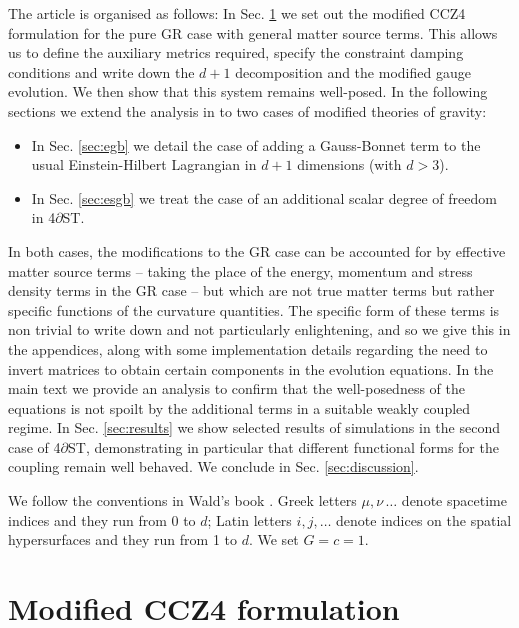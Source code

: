 \documentclass[reprint,aps,amsmath,amssymb,twoside,prd,showkeys,superscriptaddress,nofootinbib]{revtex4-2}
\begin{document}
The article is organised as follows: In Sec. \ref{sec:mCCZ4} we set out the modified CCZ4 formulation for the pure GR case with general matter source terms. This allows us to define the auxiliary metrics required, specify the constraint damping conditions and write down the $d+1$ decomposition and the modified gauge evolution. We then show that this system remains well-posed. In the following sections we extend the analysis in \cite{AresteSalo:2022hua} to two cases of modified theories of gravity:
\begin{itemize}
    \item In Sec. \ref{sec:egb} we detail the case of adding a Gauss-Bonnet term to the usual Einstein-Hilbert Lagrangian in $d+1$ dimensions (with $d>3$).
    \item In Sec. \ref{sec:esgb} we treat the case of an additional scalar degree of freedom in 4$\partial$ST.
\end{itemize}
In both cases, the modifications to the GR case can be accounted for by effective matter source terms -- taking the place of the energy, momentum and stress density terms in the GR case -- but which are not true matter terms but rather specific functions of the curvature quantities. The specific form of these terms is non trivial to write down and not particularly enlightening, and so we give this in the appendices, along with some implementation details regarding the need to invert matrices to obtain certain components in the evolution equations. In the main text we provide an analysis to confirm that the well-posedness of the equations is not spoilt by the additional terms in a suitable weakly coupled regime.
In Sec. \ref{sec:results} we show selected results of simulations in the second case of 4$\partial$ST, demonstrating in particular that different functional forms for the coupling remain well behaved. We conclude in Sec. \ref{sec:discussion}. 

We follow the conventions in Wald's book \cite{Wald:1984rg}. Greek letters $\mu,\nu\,\ldots$ denote spacetime indices and they run from 0 to $d$; Latin letters $i,j,\ldots$ denote indices on the spatial hypersurfaces and they run from 1 to $d$. We set $G=c=1$. 

\section{Modified CCZ4 formulation}
\label{sec:mCCZ4}
\end{document}
